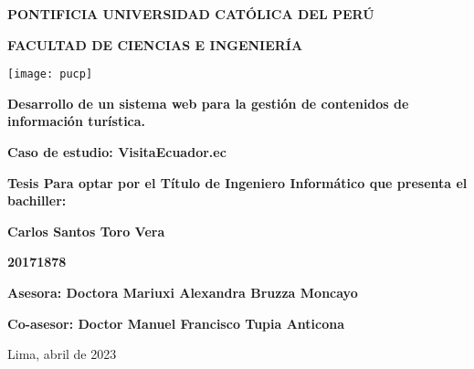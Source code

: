 
\begin{titlepage}
    \begin{center}
        \vspace*{1cm}
        \Large
        \textbf{PONTIFICIA UNIVERSIDAD CATÓLICA DEL PERÚ}

        \vspace{0.5cm}
        \textbf{FACULTAD DE CIENCIAS E INGENIERÍA}

        \vspace{0.5cm}
        \texttt{[image: pucp]}

        \vspace{1.5cm}
        \textbf{Desarrollo de un sistema web para la gestión de contenidos de información turística.}

        \textbf{Caso de estudio: VisitaEcuador.ec}

        \normalsize
        \vspace{3.5cm}
        \textbf{Tesis Para optar por el Título de Ingeniero Informático que presenta el bachiller:}

        \Large
        \vspace{1.5cm}
        \textbf{Carlos Santos Toro Vera}

        \vspace{0.3cm}
        \textbf{20171878}

        \vspace{2.5cm}
        \textbf{Asesora: Doctora Mariuxi Alexandra Bruzza Moncayo}

        \textbf{Co-asesor: Doctor Manuel Francisco Tupia Anticona}

        \normalsize
        \vspace{2.5cm}
        Lima, abril de 2023
    \end{center}
\end{titlepage}

